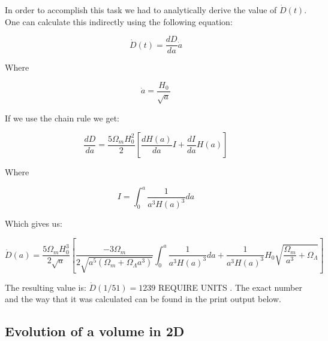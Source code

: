 \documentclass[a4paper,10pt]{article}
\begin{document}
In order to accomplish this task we had to analytically derive the value of $\dot{D}(t)$. One can calculate this indirectly using the following equation: 

\begin{equation}
\dot{D}(t) = \frac{dD}{da}\dot{a}
\end{equation} 

Where

\begin{equation}
\dot{a} = \frac{H_0}{\sqrt{a}}
\end{equation}


If we use the chain rule we get:

\begin{equation}
\frac{dD}{da} = \frac{5\Omega_mH_0^2}{2}[\frac{dH(a)}{da}I+\frac{dI}{da}H(a)]
\end{equation}

Where

\begin{equation}
I = \int^a_0\frac{1}{a^3H(a)^3}da
\end{equation}


Which gives us: 

\begin{equation}
\dot{D}(a) = \frac{5\Omega_mH_0^3}{2\sqrt{a}}[\frac{-3\Omega_m}{2\sqrt{a^5(\Omega_m+\Omega_\Lambda a^3)}}\int^a_0\frac{1}{a^3H(a)^3}da+\frac{1}{a^3H(a)^3}H_0\sqrt{\frac{\Omega_m}{a^3}+\Omega_\Lambda}]
\end{equation}

The resulting value is: $\dot{D}(1/51) = 1239$ REQUIRE UNITS . The exact number and the way that it was calculated can be found in the print output below. 

\subsection{Evolution of a volume in 2D}

 
\end{document}
